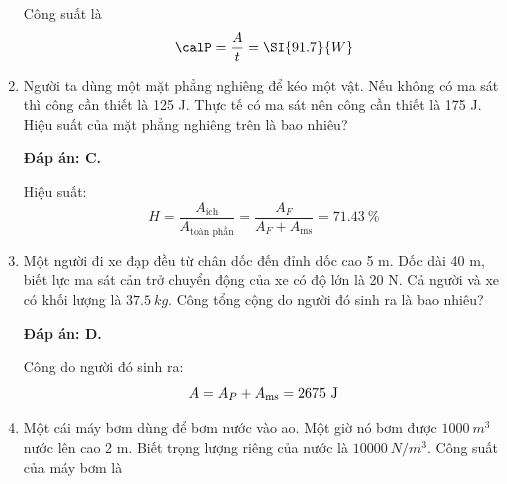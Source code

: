 \begin{enumerate}[label=\bfseries Câu \arabic*:]
{		Công suất là
		$$\calP = \dfrac{A}{t} = \SI{91.7}{W}$$
	}
	\item {}
	
	
	{Người ta dùng một mặt phẳng nghiêng để kéo một vật. Nếu không có ma sát thì công cần thiết là 125 J. Thực tế có ma sát nên công cần thiết là 175 J. Hiệu suất của mặt phẳng nghiêng trên là bao nhiêu?
		
		
	}
	
	\hideall
	{\textbf{Đáp án: C.}
		
		Hiệu suất:
		$$H=\dfrac{A_\text{ích}}{A_\text{toàn phần}} = \dfrac{A_F}{A_F + A_\text{ms}} =\SI{71.43}{\%} $$
	}
	\item {}
	
	
	{Một người đi xe đạp đều từ chân dốc đến đỉnh dốc cao 5 m. Dốc dài 40 m, biết lực ma sát cản trở chuyển động của xe có độ lớn là 20 N. Cả người và xe có khối lượng là $\SI{37.5}{kg}$. Công tổng cộng do người đó sinh ra là bao nhiêu?
		
		
	}
	
	\hideall
	{\textbf{Đáp án: D.}
		
		Công do người đó sinh ra:
		$$A=A_P + A_\text{ms} = 2675\ \text J$$	
	}
	\item {}
	
	
	{Một cái máy bơm dùng để bơm nước vào ao. Một giờ nó bơm được $\SI{1000}{m^3}$ nước lên cao 2 m. Biết trọng lượng riêng của nước là $\SI{10000}{N/m^3}$. Công suất của máy bơm là
		
		
}
\end{enumerate}
